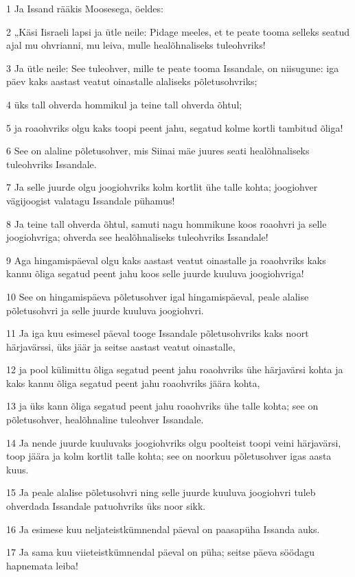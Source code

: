 \par 1 Ja Issand rääkis Moosesega, öeldes:
\par 2 „Käsi Iisraeli lapsi ja ütle neile: Pidage meeles, et te peate tooma selleks seatud ajal mu ohvrianni, mu leiva, mulle healõhnaliseks tuleohvriks!
\par 3 Ja ütle neile: See tuleohver, mille te peate tooma Issandale, on niisugune: iga päev kaks aastast veatut oinastalle alaliseks põletusohvriks;
\par 4 üks tall ohverda hommikul ja teine tall ohverda õhtul;
\par 5 ja roaohvriks olgu kaks toopi peent jahu, segatud kolme kortli tambitud õliga!
\par 6 See on alaline põletusohver, mis Siinai mäe juures seati healõhnaliseks tuleohvriks Issandale.
\par 7 Ja selle juurde olgu joogiohvriks kolm kortlit ühe talle kohta; joogiohver vägijoogist valatagu Issandale pühamus!
\par 8 Ja teine tall ohverda õhtul, samuti nagu hommikune koos roaohvri ja selle joogiohvriga; ohverda see healõhnaliseks tuleohvriks Issandale!
\par 9 Aga hingamispäeval olgu kaks aastast veatut oinastalle ja roaohvriks kaks kannu õliga segatud peent jahu koos selle juurde kuuluva joogiohvriga!
\par 10 See on hingamispäeva põletusohver igal hingamispäeval, peale alalise põletusohvri ja selle juurde kuuluva joogiohvri.
\par 11 Ja iga kuu esimesel päeval tooge Issandale põletusohvriks kaks noort härjavärssi, üks jäär ja seitse aastast veatut oinastalle,
\par 12 ja pool külimittu õliga segatud peent jahu roaohvriks ühe härjavärsi kohta ja kaks kannu õliga segatud peent jahu roaohvriks jäära kohta,
\par 13 ja üks kann õliga segatud peent jahu roaohvriks ühe talle kohta; see on põletusohver, healõhnaline tuleohver Issandale.
\par 14 Ja nende juurde kuuluvaks joogiohvriks olgu poolteist toopi veini härjavärsi, toop jäära ja kolm kortlit talle kohta; see on noorkuu põletusohver igas aasta kuus.
\par 15 Ja peale alalise põletusohvri ning selle juurde kuuluva joogiohvri tuleb ohverdada Issandale patuohvriks üks noor sikk.
\par 16 Ja esimese kuu neljateistkümnendal päeval on paasapüha Issanda auks.
\par 17 Ja sama kuu viieteistkümnendal päeval on püha; seitse päeva söödagu hapnemata leiba!
